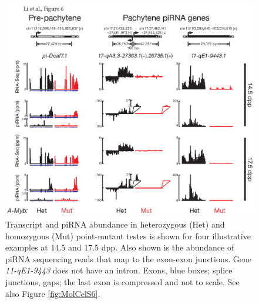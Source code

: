     \begin{figure}[htbp] %
      \centering 
      \includegraphics{Figures/MolCel/MolCel2013_Fig6.eps}
      \caption[Examples of the Effect of the \amyb{} Mutation on piRNA Expression]
      {
     	 Transcript and piRNA abundance in heterozygous (Het) and homozygous \amyb{} (Mut) point-mutant testes is shown for four illustrative examples at 14.5 and 17.5 dpp. Also shown is the abundance of piRNA sequencing reads that map to the exon-exon junctions. Gene \textit{11-qE1-9443} does not have an intron. Exons, blue boxes; splice junctions, gaps; the last exon is compressed and not to scale. See also Figure \ref{fig:MolCelS6}.
     	 }
      \label{fig:MolCelF6}
    	\end{figure}

